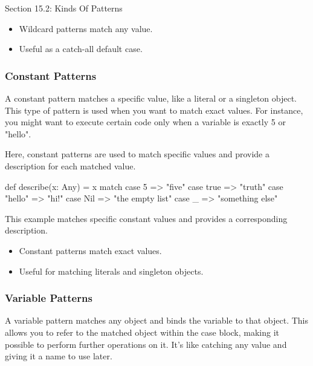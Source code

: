\begin{notes}{Section 15.2: Kinds Of Patterns}
\begin{highlight}
    \begin{itemize}
        \item Wildcard patterns match any value.
        \item Useful as a catch-all default case.
    \end{itemize}
    
    \end{highlight}
    
    \subsubsection*{Constant Patterns}
    
    A constant pattern matches a specific value, like a literal or a singleton object. This type of pattern is used when you want to match exact values. For instance, you might want to execute 
    certain code only when a variable is exactly 5 or "hello".
    
    \begin{highlight}
    
    Here, constant patterns are used to match specific values and provide a description for each matched value.
    
    \begin{code}[Scala]
    def describe(x: Any) = x match {
        case 5 => "five"
        case true => "truth"
        case "hello" => "hi!"
        case Nil => "the empty list"
        case _ => "something else"
    }
    \end{code}
    
    This example matches specific constant values and provides a corresponding description.
    
    \begin{itemize}
        \item Constant patterns match exact values.
        \item Useful for matching literals and singleton objects.
    \end{itemize}
    
    \end{highlight}
    
    \subsubsection*{Variable Patterns}
    
    A variable pattern matches any object and binds the variable to that object. This allows you to refer to the matched object within the case block, making it possible to perform further operations 
    on it. It's like catching any value and giving it a name to use later.
    

\end{notes}

